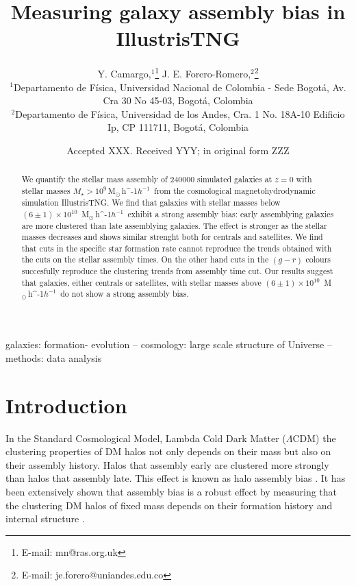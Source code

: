 \documentclass[fleqn,usenatbib]{mnras}
\title[Galaxy Assembly Bias]{Measuring galaxy assembly bias in IllustrisTNG}
\author[Camargo, Y. \& Forero-Romero J. E.]{
Y. Camargo,$^{1}$\thanks{E-mail: mn@ras.org.uk}
J. E. Forero-Romero,$^{2}$\thanks{E-mail: je.forero@uniandes.edu.co}
\\
$^{1}$Departamento de F\'isica, Universidad Nacional de Colombia - Sede Bogot\'a, Av. Cra 30 No 45-03, Bogot\'a, Colombia\\
$^{2}$Departamento de F\'isica, Universidad de los Andes, Cra. 1 No. 18A-10 Edificio Ip, CP 111711, Bogot\'a, Colombia\\
}
\date{Accepted XXX. Received YYY; in original form ZZZ}
\newcommand{\Msunh}{\,{\rm M}$_{\odot}$\,\ifmmode h^{-1}\else $h^{-1}$\fi}
\begin{document}
\label{firstpage}
\pagerange{\pageref{firstpage}--\pageref{lastpage}}
\maketitle

\begin{abstract}
We quantify the stellar mass assembly of 240000 simulated galaxies
at $z=0$ with stellar masses $M_{\star} > 10^{9}$\Msunh\ 
from the cosmological magnetohydrodynamic simulation IllustrisTNG. 
We find that galaxies with stellar masses below $(6\pm 1)\times
10^{10}$ \Msunh\ exhibit a strong assembly bias: early
assemblying galaxies are more clustered than late assemblying galaxies.
The effect is stronger as the stellar masses decreases and shows similar
strenght both for centrals and satellites. 
We find that cuts in the specific star formation rate cannot reproduce
the trends obtained with the cuts on the stellar assembly times.
On the other hand cuts in the $(g-r)$ colours succesfully reproduce
the clustering trends from assembly time cut.  
Our results suggest that galaxies, either centrals or satellites, with
stellar masses above $(6\pm 1)\times 10^{10}$ \Msunh\ do not show a
strong assembly bias.    
\end{abstract}

\begin{keywords}
galaxies: formation- evolution -- cosmology: large scale structure of Universe -- methods: data analysis
\end{keywords}



\section{Introduction}
In the Standard Cosmological Model, Lambda Cold Dark Matter
($\Lambda$CDM) the clustering properties of DM halos not only depends on their mass
but also on their assembly history.
Halos that assembly early are clustered more strongly
than halos that assembly late.
This effect is known as halo assembly bias \citep{2005MNRAS.363L..66G}.
It has been extensively shown  that
assembly bias is a robust effect
by measuring that the clustering DM halos of fixed mass depends on their formation history and internal structure \citep{2006ApJ...652...71W,2008ApJ...687...12D}.
\end{document}
